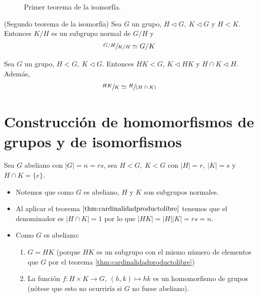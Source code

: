 \documentclass{book}
\theoremstyle{definition}
\theoremstyle{remark}
\newcommand{\normsub}{\mathbin{\triangleleft}}
\newcommand{\isom}{\simeq}
\begin{document}
\begin{figure}[h]
	\centering
	\caption{Primer teorema de la isomorfía.}
	\label{fig:tmisomorfia1}
\end{figure}

\begin{thm}(Segundo teorema de la isomorfía)
	Sea $G$ un grupo, $H \normsub G,\ K \normsub G$ y $H < K$. Entonces $K/H$ es un subgrupo normal de $G/H$ y
	\begin{align}
		\sfrac{G/H}{K/H} \isom G/K
	\end{align}
\end{thm}

\begin{thm}
	Sea $G$ un grupo, $H < G,\ K \normsub G$. Entonces $HK < G$, $K \normsub HK$ y $H\cap K \normsub H$. Además,
	\begin{align}
		\sfrac{HK}{K} \isom \sfrac{H}{(H \cap K)}
	\end{align}
\end{thm}


\section{Construcción de homomorfismos de grupos y de isomorfismos}

Sea $G$ abeliano con $|G| = n = rs$, sea $H < G,\ K < G$ con $|H| = r,\ |K| = s$ y $H\cap K = \{e\}$.
\begin{itemize}
	\item Notemos que como $G$ es abeliano, $H$ y $K$ son subgrupos normales.
	\item Al aplicar el teorema $\ref{thm:cardinalidadproductolibre}$ tenemos que el denominador es $|H\cap K| = 1$ por lo que $|HK| = |H| |K| = rs= n$.
	\item Como $G$ es abeliano:
	\begin{enumerate}
		\item $G = HK$ (porque $HK$ es un subgrupo con el mismo número de elementos que $G$ por el teorema \ref{thm:cardinalidadproductolibre})
		\item La función $f:H\times K \to G,\ (h, k)\mapsto hk$ es un homomorfismo de grupos (nótese que esto no ocurriría si $G$ no fuese abeliano).
	\end{enumerate}
\end{itemize}
\end{document}
